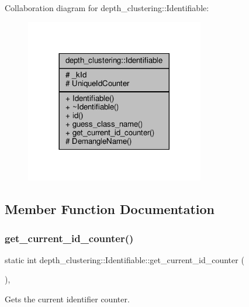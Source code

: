 Collaboration diagram for depth\+\_\+clustering\+:\+:Identifiable\+:\nopagebreak
\begin{figure}[H]
\begin{center}
\leavevmode
\includegraphics[width=221pt]{classdepth__clustering_1_1Identifiable__coll__graph}
\end{center}
\end{figure}


\subsection{Member Function Documentation}
\mbox{\label{classdepth__clustering_1_1Identifiable_a7b3be5250a82404765617ba7239041f1}} 
\subsubsection{\texorpdfstring{get\+\_\+current\+\_\+id\+\_\+counter()}{get\_current\_id\_counter()}}
{\footnotesize\ttfamily static int depth\+\_\+clustering\+::\+Identifiable\+::get\+\_\+current\+\_\+id\+\_\+counter (\begin{DoxyParamCaption}{ }\end{DoxyParamCaption})\hspace{0.3cm}{\ttfamily [inline]}, {\ttfamily [static]}}



Gets the current identifier counter. 

